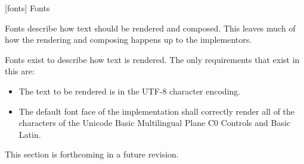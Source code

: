 
 [fonts] {Fonts}

\pnum
Fonts describe how text should be rendered and composed. This \documenttypename leaves much of how the rendering and composing happens up to the implementors.

\pnum
Fonts exist to describe how text is rendered. The only requirements that exist in this \documenttypename are:
\begin{itemize}
\item The text to be rendered is in the UTF-8 character encoding.
\item The default font face of the implementation shall correctly render all of the characters of the Unicode Basic Multilingual Plane C0 Controls and Basic Latin.
\end{itemize}

\pnum
This section is forthcoming in a future revision.

\addtocounter{SectionDepthBase}{1}








\addtocounter{SectionDepthBase}{-1}
